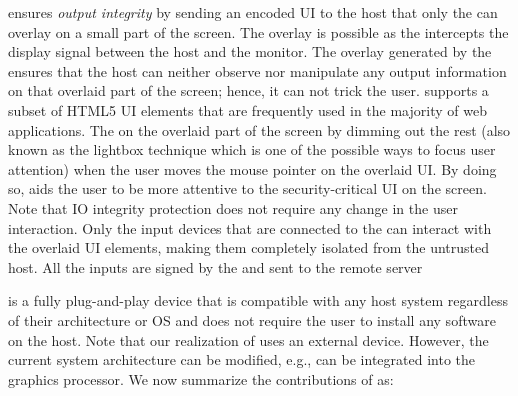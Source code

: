  \name ensures \emph{output integrity} by sending an encoded UI to the host that only the \device can overlay on a small part of the screen. The overlay is possible as the \device intercepts the display signal between the host and the monitor. The overlay generated by the \device ensures that the host can neither observe nor manipulate any output information on that overlaid part of the screen; hence, it can not trick the user. \device supports a subset of HTML5 UI elements that are frequently used in the majority of web applications. The \device {} on the overlaid part of the screen by dimming out the rest (also known as the lightbox technique which is one of the possible ways to focus user attention) when the user moves the mouse pointer on the overlaid UI. By doing so, \name aids the user to be more attentive to the security-critical UI on the screen. Note that \name IO integrity protection does not require any change in the user interaction. Only the input devices that are connected to the \device can interact with the overlaid UI elements, making them completely isolated from the untrusted host. All the inputs are signed by the \device and sent to the remote server

 


\device is a fully plug-and-play device that is compatible with any host system regardless of their architecture or OS and does not require the user to install any software on the host. Note that our realization of \name uses an external device. However, the current system architecture can be modified, e.g., \device can be integrated into the graphics processor. We now summarize the contributions of \name as:



